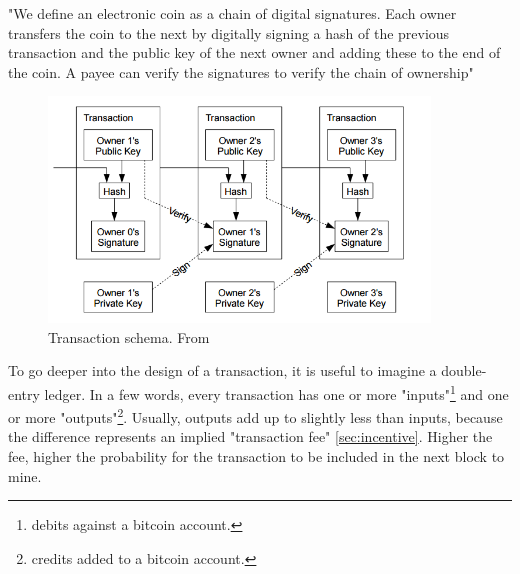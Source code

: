 "We define an electronic coin as a chain of digital signatures.  Each owner transfers 
the coin to the next by digitally signing a hash of the previous transaction and the 
public key of the next owner and adding these to the end of the coin.  A payee can 
verify the signatures to verify the chain of ownership"\cite{bitcoin}
\begin{figure}[h]
    \centering
    \includegraphics[height=6cm]{bitcoin-transaction.png}
    \caption{Transaction schema. From \cite{bitcoin}}
    \label{fig:trx}
\end{figure}

To go deeper into the design of a transaction, it is useful to imagine a double-entry
ledger. In a few words, every transaction has one or more "inputs"\footnote{debits 
against a bitcoin account.} and one or more "outputs"\footnote{credits added to a bitcoin 
account.}. Usually, outputs add up to slightly less than inputs, because the difference
represents an implied "transaction fee" \ref{sec:incentive}. Higher the fee, higher the 
probability for the transaction to be included in the next block to mine.

